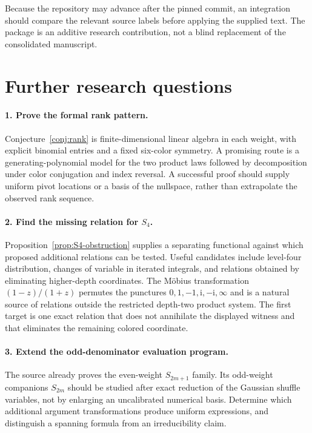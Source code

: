 \documentclass[11pt,a4paper]{article}
\numberwithin{equation}{section}
\theoremstyle{definition}
\theoremstyle{remark}
\newcommand{\ii}{\mathrm{i}}
\begin{document}
Because the repository may advance after the pinned commit, an integration should compare the relevant source labels before applying the supplied text. The package is an additive research contribution, not a blind replacement of the consolidated manuscript.

\section{Further research questions}
\label{sec:future}

\paragraph{1. Prove the formal rank pattern.}
Conjecture~\ref{conj:rank} is finite-dimensional linear algebra in each weight, with explicit binomial entries and a fixed six-color symmetry. A promising route is a generating-polynomial model for the two product laws followed by decomposition under color conjugation and index reversal. A successful proof should supply uniform pivot locations or a basis of the nullspace, rather than extrapolate the observed rank sequence.

\paragraph{2. Find the missing relation for $S_4$.}
Proposition~\ref{prop:S4-obstruction} supplies a separating functional against which proposed additional relations can be tested. Useful candidates include level-four distribution, changes of variable in iterated integrals, and relations obtained by eliminating higher-depth coordinates. The M\"obius transformation $(1-z)/(1+z)$ permutes the punctures $0,1,-1,\ii,-\ii,\infty$ and is a natural source of relations outside the restricted depth-two product system. The first target is one exact relation that does not annihilate the displayed witness and that eliminates the remaining colored coordinate.

\paragraph{3. Extend the odd-denominator evaluation program.}
The source already proves the even-weight $S_{2m+1}$ family. Its odd-weight companions $S_{2m}$ should be studied after exact reduction of the Gaussian shuffle variables, not by enlarging an uncalibrated numerical basis. Determine which additional argument transformations produce uniform expressions, and distinguish a spanning formula from an irreducibility claim.
\end{document}
